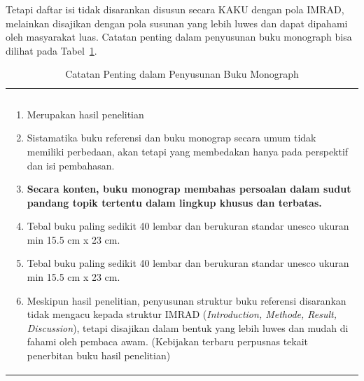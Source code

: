 \documentclass{bukupedia}
\begin{document}
Tetapi daftar isi tidak disarankan disusun secara KAKU dengan pola
IMRAD, melainkan disajikan dengan pola susunan yang lebih luwes dan
dapat dipahami oleh masyarakat luas. Catatan penting dalam penyusunan
buku monograph bisa dilihat pada Tabel~\ref{tab:buku-monograph}.

\begin{table}[htbp]
  \centering
  \caption{Catatan Penting dalam Penyusunan Buku Monograph}
  \label{tab:buku-monograph}
  {\fontsize{8}{10}\selectfont
  \begin{tabularx}{\textwidth}{|X|}
    \hline
    \rowcolor{kepalatabel}
    \multicolumn{1}{|c|}{\bfseries CATATAN PENTING YANG PERLU DICERMATI} \\
    \rowcolor{kepalatabel}
    \multicolumn{1}{|c|}{\bfseries PENYUSUNAN BUKU MONOGRAPH} \\
    \hline
    \begin{enumerate}[leftmargin=*, nosep, before=\vspace{2pt}, after=\vspace{2pt}]
      \item Merupakan hasil penelitian
      \item Sistamatika buku referensi dan buku monograp secara umum
            tidak memiliki perbedaan, akan tetapi yang membedakan hanya
            pada perspektif dan isi pembahasan.
      \item \textbf{Secara konten, buku monograp membahas persoalan
            dalam sudut pandang topik tertentu dalam lingkup khusus dan
            terbatas.}
      \item Tebal buku paling sedikit 40 lembar dan berukuran standar
            unesco ukuran min 15.5 cm x 23 cm.
      \item Tebal buku paling sedikit 40 lembar dan berukuran standar
            unesco ukuran min 15.5 cm x 23 cm.
      \item Meskipun hasil penelitian, penyusunan struktur buku
            referensi disarankan tidak mengacu kepada struktur IMRAD
            (\textit{Introduction, Methode, Result, Discussion}), tetapi
            disajikan dalam bentuk yang lebih luwes dan mudah di fahami
            oleh pembaca awam. (Kebijakan terbaru perpusnas tekait
            penerbitan buku hasil penelitian)
    \end{enumerate} \\
    \hline
  \end{tabularx}}
\end{table}
\end{document}
